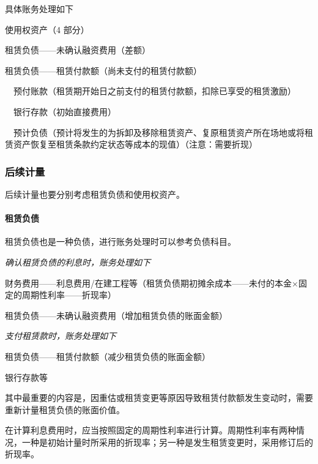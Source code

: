 \documentclass[UTF8,12pt]{ctexart}
\newenvironment{Dr}{%
	\begin{list}{}%
		{
			\setlength{\leftmargin}{2em}
			\setlength{\labelwidth}{2em}
			\setlength{\labelsep}{0pt}
			\setlength{\itemindent}{0pt}
			\setlength{\listparindent}{0pt}
			\setlength{\parsep}{0pt}
			\setlength{\topsep}{0pt}
		}
		\item[\textbf{借：}]
	}{%
	\end{list}
}
\newenvironment{Cr}{%
	\begin{list}{}%
		{
			\setlength{\leftmargin}{2em}
			\setlength{\labelwidth}{2em}
			\setlength{\labelsep}{0pt}
			\setlength{\itemindent}{0pt}
			\setlength{\listparindent}{0pt}
			\setlength{\parsep}{0pt}
			\setlength{\topsep}{0pt}
		}
		\item[\textbf{贷：}]
	}{%
	\end{list}
}
\numberwithin{equation}{section} %
\numberwithin{figure}{section}
\numberwithin{table}{section}
\begin{document}
	具体账务处理如下
	
	\begin{Dr}
		使用权资产（4 部分）
		
		租赁负债——未确认融资费用（差额）
	\end{Dr}
	\begin{Cr}
		租赁负债——租赁付款额（尚未支付的租赁付款额）
		
		\ \ 预付账款（租赁期开始日之前支付的租赁付款额，扣除已享受的租赁激励） 
		
		\ \ 银行存款（初始直接费用）
		
		\ \ 预计负债（预计将发生的为拆卸及移除租赁资产、复原租赁资产所在场地或将租赁资产恢复至租赁条款约定状态等成本的现值）（注意：需要折现）
	\end{Cr}
	
	
	
	\subsubsection{后续计量}
	后续计量也要分别考虑租赁负债和使用权资产。
	
	\paragraph{租赁负债}
	租赁负债也是一种负债，进行账务处理时可以参考负债科目。
	
	\textit{确认租赁负债的利息时，账务处理如下}
	
	\begin{Dr}
		财务费用——利息费用/在建工程等（租赁负债期初摊余成本——未付的本金×固定的周期性利率——折现率）
	\end{Dr}
	\begin{Cr}
		租赁负债——未确认融资费用（增加租赁负债的账面金额）
	\end{Cr}

	\textit{支付租赁款时，账务处理如下}
	
	\begin{Dr}
		租赁负债——租赁付款额（减少租赁负债的账面金额）
	\end{Dr}
	\begin{Cr}
		银行存款等
	\end{Cr}

	其中最重要的内容是，因重估或租赁变更等原因导致租赁付款额发生变动时，需要重新计量租赁负债的账面价值。
	
	在计算利息费用时，应当按照固定的周期性利率进行计算。周期性利率有两种情况，一种是初始计量时所采用的折现率；另一种是发生租赁变更时，采用修订后的折现率。
	
\end{document}
